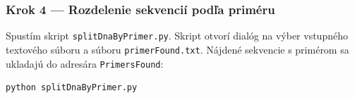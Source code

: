 \subsubsection*{Krok 4 — Rozdelenie sekvencií podľa priméru}
Spustím skript \texttt{splitDnaByPrimer.py}. Skript otvorí dialóg na výber vstupného textového súboru a súboru \texttt{primerFound.txt}. Nájdené sekvencie s primérom sa ukladajú do adresára \texttt{PrimersFound}:
\begin{verbatim}
python splitDnaByPrimer.py
\end{verbatim}
